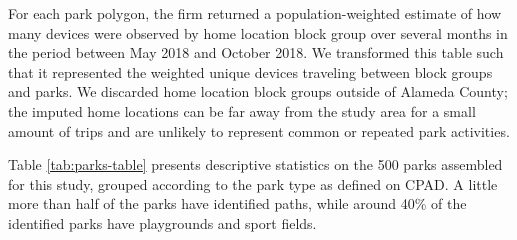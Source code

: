 \documentclass[]{elsarticle} %
\begin{document}
For each park polygon, the firm returned a population-weighted estimate of how
many devices were observed by home location block group over several months in
the period between May 2018 and October 2018. We transformed this table such
that it represented the weighted unique devices traveling between block groups
and parks. We discarded home location block groups outside of Alameda County;
the imputed home locations can be far away from the study area for a small
amount of trips and are unlikely to represent common or repeated park
activities.

Table \ref{tab:parks-table} presents descriptive statistics
on the 500 parks assembled for this study, grouped according to the
park type as defined on CPAD. A little more than half of the parks have
identified paths, while around 40\% of the identified parks have playgrounds and
sport fields.
\end{document}
